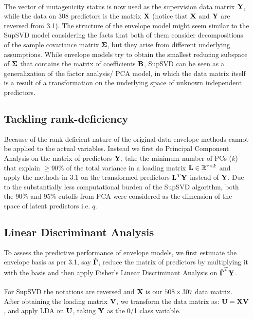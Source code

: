 \documentclass[11pt]{llncs}
\begin{document}
\paragraph{}The vector of mutagenicity status is now used as the supervision data matrix ${\mathbf{Y}}$, while the data on 308 predictors is the matrix ${\mathbf{X}}$ (notice that ${\mathbf{X}}$ and ${\mathbf{Y}}$ are reversed from 3.1). The structure of the envelope model might seem similar to the SupSVD model considering the facts that both of them consider decompositions of the sample covariance matrix ${\boldsymbol{\Sigma}}$, but they arise from different underlying assumptions. While envelope models try to obtain the smallest reducing subspace of ${\boldsymbol{\Sigma}}$ that contains the matrix of coefficients ${\mathbf{B}}$, SupSVD can be seen as a generalization of the factor analysis/ PCA model, in which the data matrix itself is a result of a transformation on the underlying space of unknown independent predictors.

\subsection{Tackling rank-deficiency} Because of the rank-deficient nature of the original data envelope methods cannot be applied to the actual variables. Instead we first do Principal Component Analysis on the matrix of predictors ${\mathbf{Y}}$, take the minimum number of PCs ($k$) that explain $\geq 90\%$ of the total variance in a loading matrix ${\mathbf{L}}\in{\mathbb{R}}^{r\times k}$ and apply the methods in 3.1 on the transformed predictors ${\mathbf{L}}^T{\mathbf{Y}}$ instead of ${\mathbf{Y}}$. Due to the substantially less computational burden of the SupSVD algorithm, both the 90\% and 95\% cutoffs from PCA were considered as the dimension of the space of latent predictors i.e. $q$.

\subsection{Linear Discriminant Analysis} To assess the predictive performance of envelope models, we first estimate the envelope basis as per 3.1, say $\hat{{\boldsymbol{\Gamma}}}$, reduce the matrix of predictors by multiplying it with the basis and then apply Fisher's Linear Discriminant Analysis \cite{fish} on $\hat{{\boldsymbol{\Gamma}}}^T{\mathbf{Y}}$.

\paragraph{}For SupSVD the notations are reversed and ${\mathbf{X}}$ is our $508\times 307$ data matrix. After obtaining the loading matrix ${\mathbf{V}}$, we transform the data matrix as: ${\mathbf{U}} = {\mathbf{X}}{\mathbf{V}}$, and apply LDA on ${\mathbf{U}}$, taking ${\mathbf{Y}}$ as the 0/1 class variable.
\end{document}
